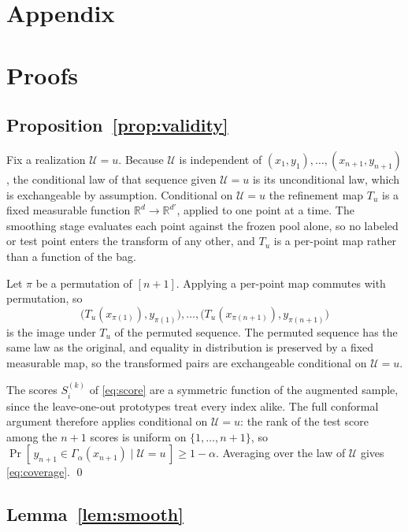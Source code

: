 \appendix
\section*{Appendix}

\section{Proofs}
\label{app:proofs}

\subsection*{Proposition~\ref{prop:validity}}

Fix a realization $\mathcal{U} = u$. Because $\mathcal{U}$ is
independent of $(x_1, y_1), \dots, (x_{n+1}, y_{n+1})$, the conditional
law of that sequence given $\mathcal{U} = u$ is its unconditional law,
which is exchangeable by assumption. Conditional on $\mathcal{U} = u$
the refinement map $T_u$ is a fixed measurable function
$\mathbb{R}^{d} \to \mathbb{R}^{d'}$, applied to one point at a time.
The smoothing stage evaluates each point against the frozen pool alone,
so no labeled or test point enters the transform of any other, and
$T_u$ is a per-point map rather than a function of the bag.

Let $\pi$ be a permutation of $[n+1]$. Applying a per-point map
commutes with permutation, so
\[
\bigl(T_u(x_{\pi(1)}), y_{\pi(1)}\bigr), \dots,
\bigl(T_u(x_{\pi(n+1)}), y_{\pi(n+1)}\bigr)
\]
is the image under $T_u$ of the permuted sequence. The permuted
sequence has the same law as the original, and equality in
distribution is preserved by a fixed measurable map, so the
transformed pairs are exchangeable conditional on $\mathcal{U} = u$.

The scores $S^{(k)}_i$ of \eqref{eq:score} are a symmetric function of
the augmented sample, since the leave-one-out prototypes treat every
index alike. The full conformal argument therefore applies conditional
on $\mathcal{U} = u$: the rank of the test score among the $n+1$ scores
is uniform on $\{1, \dots, n+1\}$, so
$\Pr[\, y_{n+1} \in \Gamma_\alpha(x_{n+1}) \mid \mathcal{U} = u \,]
\ge 1 - \alpha$. Averaging over the law of $\mathcal{U}$ gives
\eqref{eq:coverage}. \qed

\subsection*{Lemma~\ref{lem:smooth}}

